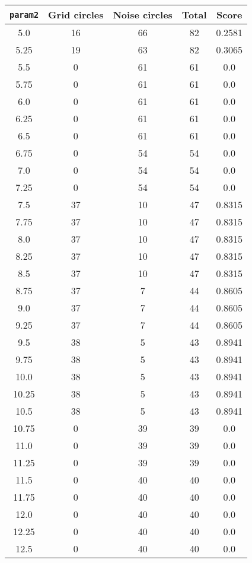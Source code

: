 \documentclass[letterpaper, 12pt]{article}
\begin{document}
\begin{longtable}{|c|c|c|c|c|}
\hline
\textbf{\texttt{param2}} & \textbf{Grid circles} & \textbf{Noise circles} & \textbf{Total} & \textbf{Score} \\
\hline
5.0 & 16 & 66 & 82 & 0.2581 \\
\hline
5.25 & 19 & 63 & 82 & 0.3065 \\
\hline
5.5 & 0 & 61 & 61 & 0.0 \\
\hline
5.75 & 0 & 61 & 61 & 0.0 \\
\hline
6.0 & 0 & 61 & 61 & 0.0 \\
\hline
6.25 & 0 & 61 & 61 & 0.0 \\
\hline
6.5 & 0 & 61 & 61 & 0.0 \\
\hline
6.75 & 0 & 54 & 54 & 0.0 \\
\hline
7.0 & 0 & 54 & 54 & 0.0 \\
\hline
7.25 & 0 & 54 & 54 & 0.0 \\
\hline
7.5 & 37 & 10 & 47 & 0.8315 \\
\hline
7.75 & 37 & 10 & 47 & 0.8315 \\
\hline
8.0 & 37 & 10 & 47 & 0.8315 \\
\hline
8.25 & 37 & 10 & 47 & 0.8315 \\
\hline
8.5 & 37 & 10 & 47 & 0.8315 \\
\hline
8.75 & 37 & 7 & 44 & 0.8605 \\
\hline
9.0 & 37 & 7 & 44 & 0.8605 \\
\hline
9.25 & 37 & 7 & 44 & 0.8605 \\
\hline
9.5 & 38 & 5 & 43 & 0.8941 \\
\hline
9.75 & 38 & 5 & 43 & 0.8941 \\
\hline
10.0 & 38 & 5 & 43 & 0.8941 \\
\hline
10.25 & 38 & 5 & 43 & 0.8941 \\
\hline
10.5 & 38 & 5 & 43 & 0.8941 \\
\hline
10.75 & 0 & 39 & 39 & 0.0 \\
\hline
11.0 & 0 & 39 & 39 & 0.0 \\
\hline
11.25 & 0 & 39 & 39 & 0.0 \\
\hline
11.5 & 0 & 40 & 40 & 0.0 \\
\hline
11.75 & 0 & 40 & 40 & 0.0 \\
\hline
12.0 & 0 & 40 & 40 & 0.0 \\
\hline
12.25 & 0 & 40 & 40 & 0.0 \\
\hline
12.5 & 0 & 40 & 40 & 0.0 \\

\end{longtable}
\end{document}
